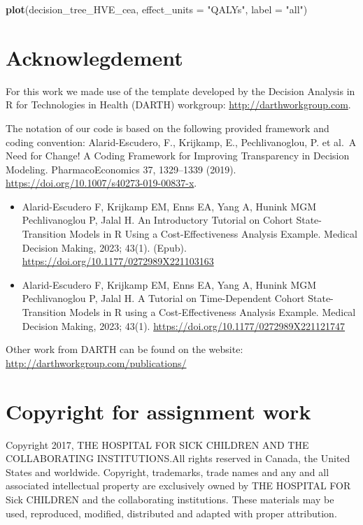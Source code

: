 \documentclass[
]{article}
\newenvironment{Shaded}{\begin{snugshade}}{\end{snugshade}}
\newcommand{\AttributeTok}[1]{\textcolor[rgb]{0.13,0.29,0.53}{#1}}
\newcommand{\FunctionTok}[1]{\textcolor[rgb]{0.13,0.29,0.53}{\textbf{#1}}}
\newcommand{\NormalTok}[1]{#1}
\newcommand{\StringTok}[1]{\textcolor[rgb]{0.31,0.60,0.02}{#1}}
\begin{document}
\begin{Shaded}
\begin{Highlighting}[]
\FunctionTok{plot}\NormalTok{(decision\_tree\_HVE\_cea, }\AttributeTok{effect\_units =} \StringTok{"QALYs"}\NormalTok{, }\AttributeTok{label =} \StringTok{"all"}\NormalTok{)}
\end{Highlighting}
\end{Shaded}

\hypertarget{acknowlegdement}{%
\section{Acknowlegdement}\label{acknowlegdement}}

For this work we made use of the template developed by the Decision
Analysis in R for Technologies in Health (DARTH) workgroup:
\url{http://darthworkgroup.com}.

The notation of our code is based on the following provided framework
and coding convention: Alarid-Escudero, F., Krijkamp, E.,
Pechlivanoglou, P. et al.~A Need for Change! A Coding Framework for
Improving Transparency in Decision Modeling. PharmacoEconomics 37,
1329--1339 (2019). \url{https://doi.org/10.1007/s40273-019-00837-x}.

\begin{itemize}
\item
  Alarid-Escudero F, Krijkamp EM, Enns EA, Yang A, Hunink MGM
  Pechlivanoglou P, Jalal H. An Introductory Tutorial on Cohort
  State-Transition Models in R Using a Cost-Effectiveness Analysis
  Example. Medical Decision Making, 2023; 43(1). (Epub).
  \url{https://doi.org/10.1177/0272989X221103163}
\item
  Alarid-Escudero F, Krijkamp EM, Enns EA, Yang A, Hunink MGM
  Pechlivanoglou P, Jalal H. A Tutorial on Time-Dependent Cohort
  State-Transition Models in R using a Cost-Effectiveness Analysis
  Example. Medical Decision Making, 2023; 43(1).
  \url{https://doi.org/10.1177/0272989X221121747}
\end{itemize}

Other work from DARTH can be found on the website:
\url{http://darthworkgroup.com/publications/}

\hypertarget{copyright-for-assignment-work}{%
\section{Copyright for assignment
work}\label{copyright-for-assignment-work}}

Copyright 2017, THE HOSPITAL FOR SICK CHILDREN AND THE COLLABORATING
INSTITUTIONS.All rights reserved in Canada, the United States and
worldwide. Copyright, trademarks, trade names and any and all associated
intellectual property are exclusively owned by THE HOSPITAL FOR Sick
CHILDREN and the collaborating institutions. These materials may be
used, reproduced, modified, distributed and adapted with proper
attribution.
\end{document}
